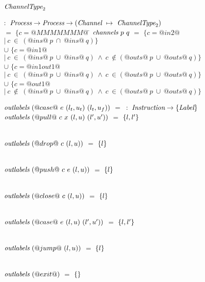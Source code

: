 \begin{figure}

\begin{tabbing}
$\textit{ChannelType}_2$   \TABDEF \kill

 \> $:$ \> $\textit{Process} \to \textit{Process} \to (\textit{Channel} ~\mapsto~ \textit{ChannelType}_2)$ \\

  \> $=$    \> $\{ c=@MMMMMMM@~$\= \kill
$\textit{channels}~p~q$
  \> $=$    \> $\{ c=@in2@$
            \> $|~c~\in~(@ins@~p~\cap~@ins@~q) \}$ 
            \\

  \> $\cup$ \> $\{ c=@in1@$
            \> $ |~c~\in~(@ins@~p~\cup~@ins@~q)~\wedge~c~\not\in(@outs@~p~\cup~@outs@~q) \}$ \\

  \> $\cup$ \> $\{ c=@in1out1@$
            \> $|~c~\in~(@ins@~p~\cup~@ins@~q)~\wedge~c~\in(@outs@~p~\cup~@outs@~q) \}$ \\

  \> $\cup$ \> $\{ c=@out1@$
            \> $ |~c~\not\in~(@ins@~p~\cup~@ins@~q)~\wedge~c~\in(@outs@~p~\cup~@outs@~q) \}$ 
\end{tabbing}

\newcommand\funClauseDef[3]
{ $\ti{#1}~(#2)$ \> $=$ \> $#3$
}
\newcommand\outlabelsDef[2]
{ \funClauseDef{outlabels}{#1}{\sgl{#2}} 
}

\vspace{1ex}
\begin{tabbing}
$\textit{outlabels}~(@case@~e~(l_t,u_t)~(l_t,u_f))$ \TABSKIP $=$ \TABSKIP \kill
{} \> $~:$ \> $\textit{Instruction} \to \{ \textit{Label} \}$ \\
\outlabelsDef{@pull@~c~x~(l,u)~(l',u')}{l,l'}              \\
\outlabelsDef{@drop@~c~(l,u)}{l}                \\
\outlabelsDef{@push@~c~e~(l,u)}{l}              \\
\outlabelsDef{@close@~c~(l,u)}{l}              \\
\outlabelsDef{@case@~e~(l,u)~(l',u')}{l, l'}    \\
\outlabelsDef{@jump@~(l,u)}{l}                  \\
\outlabelsDef{@exit@}{}
\end{tabbing}


\end{figure}
